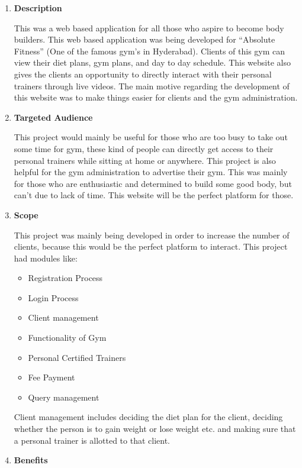 \documentclass[fleqn,10pt]{../SelfArx} %
\begin{document}
\vspace{0.5cm}
\begin{enumerate}
\item \textbf{Description}

This was a web based application for all those who aspire to become body builders. This web based application was being developed for “Absolute Fitness” (One of the famous gym’s in Hyderabad). Clients of this gym can view their diet plans, gym plans, and day to day schedule. This website also gives the clients an opportunity to directly interact with their personal trainers through live videos. The main motive regarding the development of this website was to make things easier for clients and the gym administration.

\item \textbf{Targeted Audience}

This project would mainly be useful for those who are too busy to take out some time for gym, these kind of people can directly get access to their personal trainers while sitting at home or anywhere. This project is also helpful for the gym administration to advertise their gym. This was mainly for those who are enthusiastic and determined to build some good body, but can’t due to lack of time. This website will be the perfect platform for those.

\item \textbf{Scope}

This project was mainly being developed in order to increase the number of clients, because this would be the perfect platform to interact. This project had modules like:
\begin{itemize}
    \item 	Registration Process
 \item 	Login Process
 \item 	Client management
 \item 	Functionality of Gym
 \item 	Personal Certified Trainers
 \item 	Fee Payment
 \item 	Query management
\end{itemize}


Client management includes deciding the diet plan for the client, deciding whether the person is to gain weight or lose weight etc. and making sure that a personal trainer is allotted to that client.

\item \textbf{Benefits}


\end{enumerate}
\end{document}
